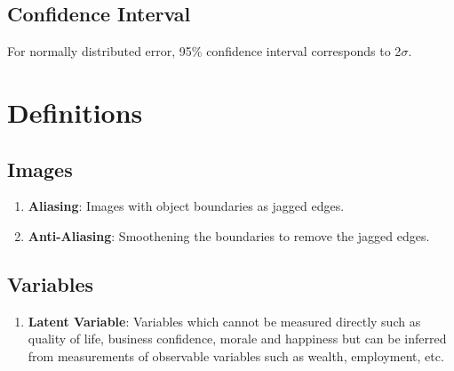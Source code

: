 \documentclass[a4paper, 12pt]{report}
\begin{document}
\section{Confidence Interval}
For normally distributed error, 95\% confidence interval corresponds to 2$\sigma$.

\chapter{Definitions}

\section{Images}
\begin{enumerate}

\item \textbf{Aliasing}: Images with object boundaries as jagged edges. 
\item \textbf{Anti-Aliasing}: Smoothening the boundaries to remove the jagged edges.

\end{enumerate}

\section{Variables}
\begin{enumerate}
\item \textbf{Latent Variable}: Variables which cannot be measured directly such as quality of life, business confidence, morale and happiness but can be inferred from measurements of observable variables such as wealth, employment, etc.

\end{enumerate}
\end{document}
